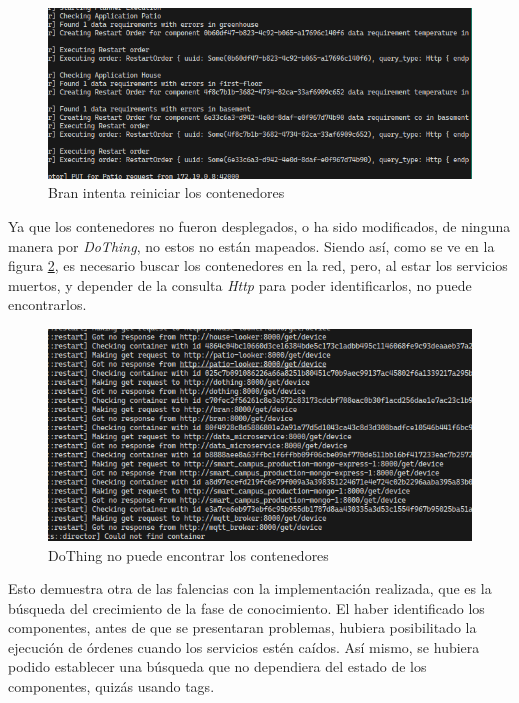\begin{figure}[ht]
    \centering
    \caption{Bran intenta reiniciar los contenedores}
    \label{fig:FindAny}
    \includegraphics[width=\linewidth]{images/BranOrdersRestarts.png}
    \vspace{-4mm}
\end{figure}

\newpage

Ya que los contenedores no fueron desplegados, o ha sido modificados, de ninguna manera por \textit{DoThing}, no estos no están mapeados. Siendo así, como se ve en la figura \ref{fig:CantFindAny}, es necesario buscar los contenedores en la red, pero, al estar los servicios muertos, y depender de la consulta \textit{Http} para poder identificarlos, no puede encontrarlos.


\begin{figure}[H]
    \centering
    \caption{DoThing no puede encontrar los contenedores}
    \label{fig:CantFindAny}
    \includegraphics[width=\linewidth]{images/CantFind.png}
    \vspace{-4mm}
\end{figure}

Esto demuestra otra de las falencias con la implementación realizada, que es la búsqueda del crecimiento de la fase de conocimiento. El haber identificado los componentes, antes de que se presentaran problemas, hubiera posibilitado la ejecución de órdenes cuando los servicios estén caídos. Así mismo, se hubiera podido establecer una búsqueda que no dependiera del estado de los componentes, quizás usando tags.


